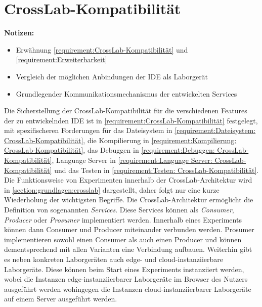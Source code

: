 \section{CrossLab-Kompatibilität}\label{section:konzeption:crosslab-kompatibilität}

\begin{note}
    \textbf{Notizen:}
    \begin{itemize}
        \item Erwähnung \autoref{requirement:CrossLab-Kompatibilität} und \autoref{requirement:Erweiterbarkeit}
        \item Vergleich der möglichen Anbindungen der IDE als Laborgerät
        \item Grundlegender Kommunikationsmechanismus der entwickelten Services
    \end{itemize}
\end{note}

Die Sicherstellung der CrossLab-Kompatibilität für die verschiedenen Features der zu entwickelnden IDE ist in \autoref{requirement:CrossLab-Kompatibilität} festgelegt, mit spezifischeren Forderungen für das Dateisystem in \autoref{requirement:Dateisystem: CrossLab-Kompatibilität}, die Kompilierung in \autoref{requirement:Kompilierung: CrossLab-Kompatibilität}, das Debuggen in \autoref{requirement:Debuggen: CrossLab-Kompatibilität}, Language Server in \autoref{requirement:Language Server: CrossLab-Kompatibilität} und das Testen in \autoref{requirement:Testen: CrossLab-Kompatibilität}. Die Funktionsweise von Experimenten innerhalb der CrossLab-Architektur wird in \autoref{section:grundlagen:crosslab} dargestellt, daher folgt nur eine kurze Wiederholung der wichtigsten Begriffe. Die CrossLab-Architektur ermöglicht die Definition von sogenannten \emph{Services}. Diese Services können als \emph{Consumer}, \emph{Producer} oder \emph{Prosumer} implementiert werden. Innerhalb eines Experiments können dann Consumer und Producer miteinander verbunden werden. Prosumer implementieren sowohl einen Consumer als auch einen Producer und können dementsprechend mit allen Varianten eine Verbindung aufbauen. Weiterhin gibt es neben konkreten Laborgeräten auch edge- und cloud-instanziierbare Laborgeräte. Diese können beim Start eines Experiments instanziiert werden, wobei die Instanzen edge-instanziierbarer Laborgeräte im Browser des Nutzers ausgeführt werden wohingegen die Instanzen cloud-instanziierbarer Laborgeräte auf einem Server ausgeführt werden.

